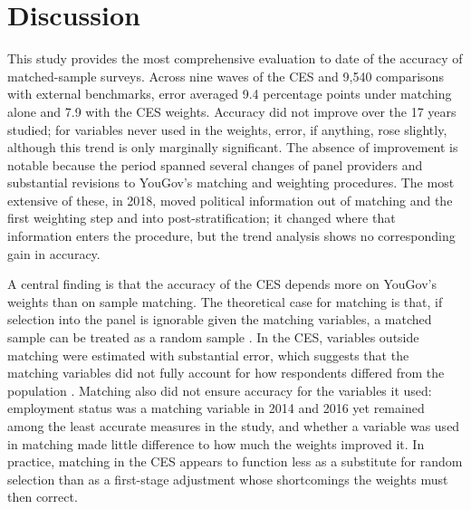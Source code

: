 \documentclass[12pt]{article}
\begin{document}



\section{Discussion}\label{sec:discussion}
This study provides the most comprehensive evaluation to date of the accuracy of matched-sample surveys. Across nine waves of the CES and 9,540 comparisons with external benchmarks, error averaged 9.4 percentage points under matching alone and 7.9 with the CES weights. Accuracy did not improve over the 17 years studied; for variables never used in the weights, error, if anything, rose slightly, although this trend is only marginally significant. The absence of improvement is notable because the period spanned several changes of panel providers and substantial revisions to YouGov's matching and weighting procedures. The most extensive of these, in 2018, moved political information out of matching and the first weighting step and into post-stratification; it changed where that information enters the procedure, but the trend analysis shows no corresponding gain in accuracy.

A central finding is that the accuracy of the CES depends more on YouGov's weights than on sample matching. The theoretical case for matching is that, if selection into the panel is ignorable given the matching variables, a matched sample can be treated as a random sample \parencite{rivers_sample_2006, rivers_sampling_2007}. In the CES, variables outside matching were estimated with substantial error, which suggests that the matching variables did not fully account for how respondents differed from the population \parencite{mercer_theory_2017}. Matching also did not ensure accuracy for the variables it used: employment status was a matching variable in 2014 and 2016 yet remained among the least accurate measures in the study, and whether a variable was used in matching made little difference to how much the weights improved it. In practice, matching in the CES appears to function less as a substitute for random selection than as a first-stage adjustment whose shortcomings the weights must then correct.
\end{document}
